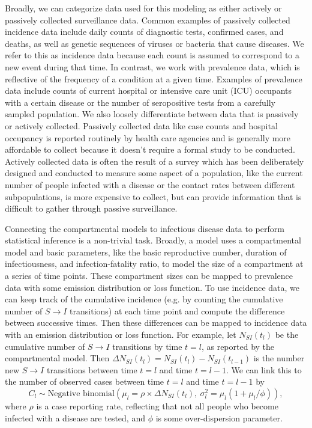 Broadly, we can categorize data used for this modeling as either actively or passively collected surveillance data.
Common examples of passively collected incidence data include daily counts of diagnostic tests, confirmed cases, and deaths, as well as genetic sequences of viruses or bacteria that cause diseases.
We refer to this as incidence data because each count is assumed to correspond to a new event during that time.
In contrast, we work with prevalence data, which is reflective of the frequency of a condition at a given time.
Examples of prevalence data include counts of current hospital or intensive care unit (ICU) occupants with a certain disease or the number of seropositive tests from a carefully sampled population.
We also loosely differentiate between data that is passively or actively collected.
Passively collected data like case counts and hospital occupancy is reported routinely by health care agencies and is generally more affordable to collect because it doesn't require a formal study to be conducted.
Actively collected data is often the result of a survey which has been deliberately designed and conducted to measure some aspect of a population, like the current number of people infected with a disease or the contact rates between different subpopulations, is more expensive to collect, but can provide information that is difficult to gather through passive surveillance.

Connecting the compartmental models to infectious disease data to perform statistical inference is a non-trivial task.
Broadly, a model uses a compartmental model and basic parameters, like the basic reproductive number, duration of infectiousness, and infection-fatality ratio, to model the size of a compartment at a series of time points.
These compartment sizes can be mapped to prevalence data with some emission distribution or loss function.
To use incidence data, we can keep track of the cumulative incidence (e.g. by counting the cumulative number of \( S \to I \) transitions) at each time point and compute the difference between successive times.
Then these differences can be mapped to incidence data with an emission distribution or loss function.
For example, let \( N_{S I}(t_l) \) be the cumulative number of \( S \to I \) transitions by time \( t = l \), as reported by the compartmental model.
Then \( \Delta N_{S I}(t_l) = N_{S I}(t_l) - N_{S I}(t_{l-1}) \) is the number new \( S \to I \) transitions between time \( t = l \) and time \( t = l - 1 \).
We can link this to the number of observed cases between time \( t = l \) and time \( t = l - 1 \) by
\begin{equation}
C_l \sim \text{Negative binomial}\left (\mu_l =  \rho \times \Delta N_{S I}(t_l),\ {\sigma^2_l} = \mu_l (1 + \mu_l / \phi )\right ),
\label{ch_2:eqn:example_case_emission}
\end{equation}
where \( \rho \) is a case reporting rate, reflecting that not all people who become infected with a disease are tested, and \( \phi \) is some over-dispersion parameter.

